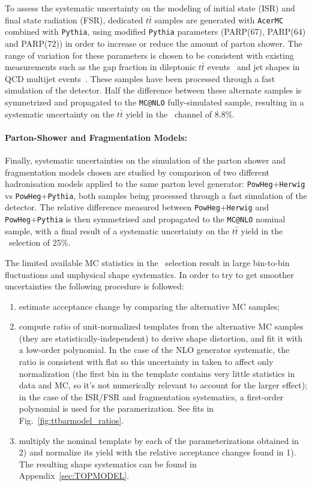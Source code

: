 To assess the systematic uncertainty on the modeling of 
initial state (ISR) and final state radiation (FSR), dedicated
$t\bar{t}$ samples are generated with \texttt{AcerMC}
combined with \texttt{Pythia}, using modified \texttt{Pythia} parameters 
(PARP(67), PARP(64) and PARP(72)) 
in order to increase or reduce the amount of parton shower. 
The range of variation for these parameters is chosen to be 
consistent with existing measurements such as the gap fraction in dileptonic 
$t\bar{t}$ events~\cite{ttjet} and jet shapes in QCD multijet events~\cite{morelessPS}.  
These samples have been processed through a fast simulation
of the detector. Half the difference between these alternate samples is symmetrized 
and propagated to the \texttt{MC@NLO} fully-simulated sample, resulting in a
systematic uncertainty on the $t\bar{t}$ yield in the \tight\ channel of 8.8\%.

\paragraph{Parton-Shower and Fragmentation Models:}
Finally, systematic uncertainties on the simulation 
of the parton shower and fragmentation models chosen 
are studied by comparison of two different hadronisation 
models applied to the same parton level generator: 
\texttt{PowHeg}+\texttt{Herwig} vs \texttt{PowHeg}+\texttt{Pythia}, 
both samples being processed through a fast simulation of the detector.
The relative difference measured between 
\texttt{PowHeg}+\texttt{Herwig} and \texttt{PowHeg}+\texttt{Pythia} is 
then symmetrised and propagated to the 
\texttt{MC@NLO} nominal sample, with a final
result of a systematic uncertainty on the 
$t\bar{t}$ yield in the \tight\ selection of 25\%. 

\ifIsINT
\vspace{1cm}
The limited available MC statistics in the \tight\ selection result in large bin-to-bin fluctuations and unphysical shape systematics.
In order to try to get smoother uncertainties the following procedure is followed:
\begin{enumerate}
\item estimate acceptance change by comparing the alternative MC samples;
\item compute ratio of unit-normalized templates from the alternative MC samples (they are statistically-independent) to derive shape
         distortion, and fit it with a low-order polynomial. In the case of the NLO generator systematic, the ratio is consistent with flat so this
         uncertainty in taken to affect only normalization (the first bin in the template contains very little statistics in data and MC, so it's not
         numerically relevant to account for the larger effect); in the case of the ISR/FSR and fragmentation systematics, a first-order polynomial
         is used for the paramerization. See fits in Fig.~\ref{fig:ttbarmodel_ratios}.
\item multiply the nominal template by each of the parameterizations obtained in 2) and normalize its yield with the relative acceptance changes found in 1).
          The resulting shape systematics can be found in Appendix~\ref{sec:TOPMODEL}.
\end{enumerate}

